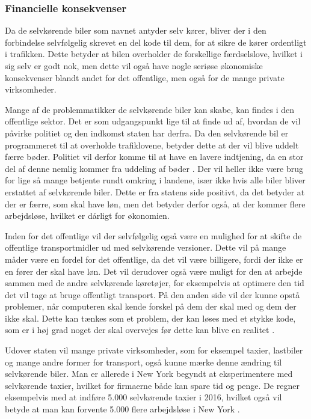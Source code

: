 \subsubsection{Financielle konsekvenser}
Da de selvkørende biler som navnet antyder selv kører, bliver der i den forbindelse selvfølgelig skrevet en del kode til dem, for at sikre de kører ordentligt i trafikken. Dette betyder at bilen overholder de forskellige færdselslove, hvilket i sig selv er godt nok, men dette vil også have nogle seriøse økonomiske konsekvenser blandt andet for det offentlige, men også for de mange private virksomheder. 

Mange af de problemmatikker de selvkørende biler kan skabe, kan findes i den offentlige sektor. Det er som udgangspunkt lige til at finde ud af, hvordan de vil påvirke politiet og den indkomst staten har derfra. Da den selvkørende bil er programmeret til at overholde trafiklovene, betyder dette at der vil blive uddelt færre bøder. Politiet vil derfor komme til at have en lavere indtjening, da en stor del af denne nemlig kommer fra uddeling af bøder \cite{B}. Der vil heller ikke være brug for lige så mange betjente rundt omkring i landene, især ikke hvis alle biler bliver erstattet af selvkørende biler. Dette er fra statens side positivt, da det betyder at der er færre, som skal have løn, men det betyder derfor også, at der kommer flere arbejdsløse, hvilket er dårligt for økonomien.

Inden for det offentlige vil der selvfølgelig også være en mulighed for at skifte de offentlige transportmidler ud med selvkørende versioner. Dette vil på mange måder være en fordel for det offentlige, da det vil være billigere, fordi der ikke er en fører der skal have løn. Det vil derudover også være muligt for den at arbejde sammen med de andre selvkørende køretøjer, for eksempelvis at optimere den tid det vil tage at bruge offentligt transport. På den anden side vil der kunne opstå problemer, når computeren skal kende forskel på dem der skal med og dem der ikke skal. Dette kan tænkes som et problem, der kan løses med et stykke kode, som er i høj grad noget der skal overvejes før dette kan blive en realitet \cite{BUS}.

Udover staten vil mange private virksomheder, som for eksempel taxier, lastbiler og mange andre former for transport, også kunne mærke denne ændring til selvkørende biler. Man er allerede i New York begyndt at eksperimentere med selvkørende taxier, hvilket for firmaerne både kan spare tid og penge. De regner eksempelvis med at indføre 5.000 selvkørende taxier i 2016, hvilket også vil betyde at man kan forvente 5.000 flere arbejdsløse i New York \cite{TAXI}. 

